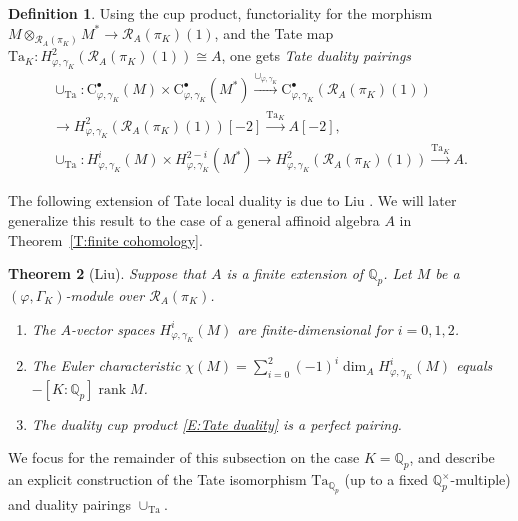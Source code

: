 \documentclass[12pt]{article}
\newtheorem{theorem}{Theorem}[subsection]
\theoremstyle{definition}
\newtheorem{defn}[theorem]{Definition}
\numberwithin{equation}{theorem}
\newcommand{\calR}{\mathcal{R}}
\newcommand{\QQ}{\mathbb{Q}}
\newcommand{\rmC}{\mathrm{C}}
\def\Qp{\QQ_p}
\newcommand{\Ta}{\mathrm{Ta}}
\DeclareMathOperator{\rank}{rank}
\begin{document}
\begin{defn}
Using the cup product, functoriality for the morphism $M
\otimes_{\calR_A(\pi_K)} M^* \to \calR_A(\pi_K)(1)$, and the Tate map
$\Ta_K: H^2_{\varphi, \gamma_K}(\calR_A(\pi_K)(1)) \cong A$, one gets
\emph{Tate duality pairings}
\begin{gather}
\nonumber
\cup_\Ta: \rmC^\bullet_{\varphi, \gamma_K}(M) \times \rmC^\bullet_{\varphi, \gamma_K}(M^*) \xrightarrow{\cup_{\varphi,\gamma_K}} \rmC^\bullet_{\varphi, \gamma_K}(\calR_A(\pi_K)(1)) \\
\label{E:Tate duality complex}
\to H^2_{\varphi, \gamma_K}(\calR_A(\pi_K)(1))[-2] \xrightarrow{\Ta_K} A[-2],
\\
\label{E:Tate duality}
\cup_\Ta: H^i_{\varphi, \gamma_K}(M) \times H^{2-i}_{\varphi, \gamma_K}(M^*) \to H^2_{\varphi, \gamma_K}(\calR_A(\pi_K)(1)) \xrightarrow{\Ta_K} A.
\end{gather}
\end{defn}

The following extension of Tate local duality is due to Liu \cite{liu}.  We will later generalize this result to the case of a general affinoid algebra $A$ in Theorem~\ref{T:finite cohomology}.
\begin{theorem}[Liu]  
\label{T:Liu}
Suppose that $A$ is a finite extension of $\QQ_p$. Let $M$ be a $(\varphi, \Gamma_K)$-module over $\calR_A(\pi_K)$.
\begin{enumerate}
\item[(1)] The $A$-vector spaces $H^i_{\varphi,\gamma_K}(M)$ are finite-dimensional for $i=0,1,2$.
\item[(2)]
The Euler characteristic $\chi(M) = \sum_{i=0}^2 (-1)^i \dim_A H^i_{\varphi,\gamma_K}(M)$ equals
$-[K:\QQ_p] \rank M$.
\item[(3)]
The duality cup product \eqref{E:Tate duality} is a perfect pairing.
\end{enumerate}
\end{theorem}

We focus for the remainder of this subsection on the case $K=\Qp$, and
describe an explicit construction of the Tate isomorphism $\Ta_{\Qp}$
(up to a fixed $\QQ_p^\times$-multiple) and duality pairings
$\cup_\Ta$.
\end{document}
